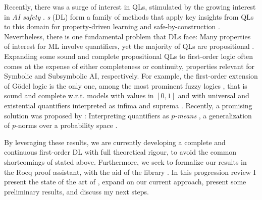 Recently, there was a surge of interest in QLs, stimulated by the growing interest in \emph{AI safety} \citep{dalrymple2024guaranteedsafeaiframework, davidad24}. \emph{\DL{}s} (DL) form a family of methods that apply key insights from QLs to this domain for property-driven learning and safe-by-construction \InAI{} \citep{FLINKOW2025103280, badreddine2022logic}. Nevertheless, there is one fundamental problem that DLs face: Many properties of interest for ML involve quantifiers, yet the majority of QLs are propositional \citep{bacci2023propositional, cintula2011handbook, slusarz2023logic}.  Expanding some sound and complete propositional QLs to first-order logic often comes at the expense of either completeness or continuity, properties relevant for Symbolic and Subsymbolic AI, respectively.  For example, the first-order extension of Gödel logic is the only one, among the most prominent fuzzy logics \cite{prooffuzzy,slusarz2023logic}, that is sound and complete w.r.t. models with values in $[0,1]$ and with universal and existential quantifiers interpreted as infima and suprema \cite{BAAZ200723}. Recently, a promising solution was proposed by \citeauthor{capucci2025quantifiersquantitativereasoning}: Interpreting quantifiers as \textit{$p$-means} \citep{capucci2025quantifiersquantitativereasoning}, a generalization of $p$-norms over a probability space \citep{lpspaces}.  

By leveraging these results, we are currently developing a complete and continuous first-order DL with full theoretical rigour, to avoid the common shortcomings  of \InAI{} stated above. Furthermore, we seek to formalize our results in the Rocq proof assistant, with the aid of the \mathcomp{} library \citep{mathcomp}. In this progression review I present the state of the art of \yada, expand on our current approach, present some preliminary results,  and discuss my next steps.

